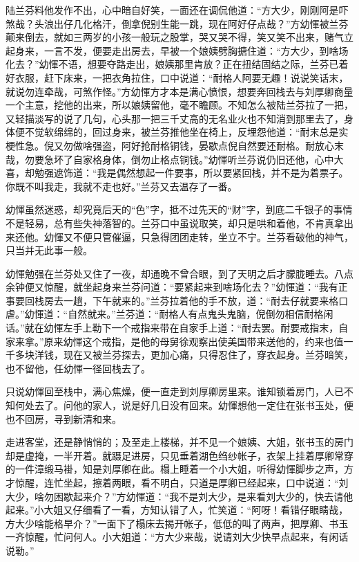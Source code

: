 \documentclass[12pt,UTF8]{ctexbook}
\begin{document}
{{{陆兰芬料他发作不出，心中暗自好笑，一面还在调侃他道：“方大少，刚刚阿是吓煞哉？头浪出仔几化格汗，倒拿倪别生能一跳，现在阿好仔点哉？”方幼惲被兰芬颠来倒去，就如三两岁的小孩一般玩之股掌，哭又哭不得，笑又笑不出来，赌气立起身来，一言不发，便要走出房去，早被一个娘姨劈胸搪住道：“方大少，到啥场化去？”幼惲不语，想要夺路走出，娘姨那里肯放？正在扭结固结之际，兰芬已着好衣服，赶下床来，一把衣角拉住，口中说道：“耐格人阿要无趣！说说笑话末，就说勿连牵哉，可煞作怪。”方幼惲方才本是满心愤恨，想要奔回栈去与刘厚卿商量一个主意，挖他的出来，所以娘姨留他，毫不瞻顾。不知怎么被陆兰芬拉了一把，又轻描淡写的说了几句，心头那一把三千丈高的无名业火也不知消到那里去了，身体便不觉软绵绵的，回过身来，被兰芬推他坐在椅上，反埋怨他道：“耐末总是实梗性急。倪又勿做啥强盗，阿好抢耐格铜钱，晏歇点倪自然要还耐格。耐放心末哉，勿要急坏了自家格身体，倒勿止格点铜钱。”幼惲听兰芬说仍旧还他，心中大喜，却勉强遮饰道：“我是偶然想起一件要事，所以要紧回栈，并不是为着票子。你既不叫我走，我就不走也好。”兰芬又去温存了一番。

幼惲虽然迷惑，却究竟后天的“色”字，抵不过先天的“财”字，到底二千银子的事情不是轻易，总有些失神落智的。兰芬口中虽说取笑，却只是哄和着他，不肯真拿出来还他。幼惲又不便只管催逼，只急得团团走转，坐立不宁。兰芬看破他的神气，只当并无此事一般。

幼惲勉强在兰芬处又住了一夜，却通晚不曾合眼，到了天明之后才朦胧睡去。八点余钟便又惊醒，就坐起身来兰芬问道：“要紧起来到啥场化去？”幼惲道：“我有正事要回栈房去一趟，下午就来的。”兰芬拉着他的手不放，道：“耐去仔就要来格口虐。”幼惲道：“自然就来。”兰芬道：“耐格人有点鬼头鬼脑，倪倒勿相信耐格闲话。”就在幼惲左手上勒下一个戒指来带在自家手上道：“耐去罢。耐要戒指末，自家来拿。”原来幼惲这个戒指，是他的母舅徐观察出使美国带来送他的，约来也值一千多块洋钱，现在又被兰芬探去，更加心痛，只得忍住了，穿衣起身。兰芬暗笑，也不留他，任幼惲一径回栈去了。

只说幼惲回至栈中，满心焦燥，便一直走到刘厚卿房里来。谁知锁着房门，人已不知何处去了。问他的家人，说是好几日没有回来。幼惲想他一定住在张书玉处，便也不回房，寻到新清和来。

走进客堂，还是静悄悄的；及至走上楼梯，并不见一个娘姨、大姐，张书玉的房门却是虚掩，一半开着。就蹑足进房，只见垂着湖色绉纱帐子，衣架上挂着厚卿常穿的一件漳缎马褂，知是刘厚卿在此。榻上睡着一个小大姐，听得幼惲脚步之声，方才惊醒，连忙坐起，擦着两眼，看不明白，只道是厚卿已经起来，口中说道：“刘大少，啥勿困歇起来介？”方幼惲道：“我不是刘大少，是来看刘大少的，快去请他起来。”小大姐又仔细看了一看，方知认错了人，忙笑道：“阿呀！看错仔眼睛哉，方大少啥能格早介？”一面下了榻床去揭开帐子，低低的叫了两声，把厚卿、书玉一齐惊醒，忙问何人。小大姐道：“方大少来哉，说请刘大少快早点起来，有闲话说勒。”

}}}
\end{document}
